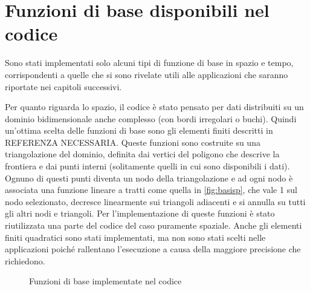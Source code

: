 \documentclass[a4paper,11pt,twoside,openright]{book}							%
\begin{document}
\section{Funzioni di base disponibili nel codice}
Sono stati implementati solo alcuni tipi di funzione di base in spazio e tempo, corrispondenti a quelle che si sono rivelate utili alle applicazioni che saranno riportate nei capitoli successivi. 

Per quanto riguarda lo spazio, il codice è stato pensato per dati distribuiti su un dominio bidimensionale anche complesso (con bordi irregolari o buchi). Quindi un'ottima scelta delle funzioni di base sono gli elementi finiti descritti in REFERENZA NECESSARIA. Queste funzioni sono costruite su una triangolazione del dominio, definita dai vertici del poligono che descrive la frontiera e dai punti interni (solitamente quelli in cui sono disponibili i dati). Ognuno di questi punti diventa un nodo della triangolazione e ad ogni nodo è associata una funzione lineare a tratti come quella in \ref{fig:basisp}, che vale 1 sul nodo selezionato, decresce linearmente sui triangoli adiacenti e si annulla su tutti gli altri nodi e triangoli. Per l'implementazione di queste funzioni è stato riutilizzata una parte del codice del caso puramente spaziale. Anche gli elementi finiti quadratici sono stati implementati, ma non sono stati scelti nelle applicazioni poiché rallentano l'esecuzione a causa della maggiore precisione che richiedono.

\begin{figure}[t]
	\centering
	\caption{Funzioni di base implementate nel codice}
	\label{fig:basi}
\end{figure}
\end{document}
